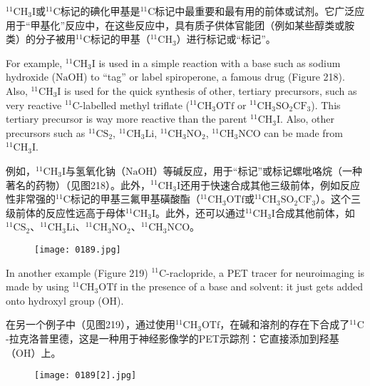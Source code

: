 \documentclass[dvipsnames, svgnames,a4paper,11pt]{article}
\begin{document}
$\mathrm{{}^{11}CH_3I}$或$\mathrm{{}^{11}C}$标记的碘化甲基是${}^\mathrm{11}\mathrm{C}$标记中最重要和最有用的前体或试剂。它广泛应用于“甲基化”反应中，在这些反应中，具有质子供体官能团（例如某些醇类或胺类）的分子被用$\mathrm{{}^{11}C}$标记的甲基（$\mathrm{{}^{11}CH_3}$）进行标记或“标记”。

For example, $\mathrm{{}^{11}CH_3I}$ is used in a simple reaction with a base such as sodium hydroxide ($\mathrm{NaOH}$) to “tag” or label spiroperone, a famous drug (Figure 218). Also, $\mathrm{{}^{11}CH_3I}$ is used for the quick synthesis of other, tertiary precursors, such as very reactive $\mathrm{{}^{11}C}$-labelled methyl triflate ($\mathrm{{}^{11}CH_3OTf}$ or $\mathrm{{}^{11}CH_3SO_2CF_3}$). This tertiary precursor is way more reactive than the parent $\mathrm{{}^{11}CH_3I}$. Also, other precursors such as $\mathrm{{}^{11}CS_2}$, $\mathrm{{}^{11}CH_3Li}$, $\mathrm{{}^{11}CH_3NO_2}$, $\mathrm{{}^{11}CH_3NCO}$ can be made from $\mathrm{{}^{11}CH_3I}$.

例如，$\mathrm{{}^{11}CH_3I}$与氢氧化钠（$\mathrm{NaOH}$）等碱反应，用于“标记”或标记螺吡咯烷（一种著名的药物）（见图218）。此外，$\mathrm{{}^{11}CH_3I}$还用于快速合成其他三级前体，例如反应性非常强的$\mathrm{{}^{11}C}$标记的甲基三氟甲基磺酸酯（$\mathrm{{}^{11}CH_3OTf}$或$\mathrm{{}^{11}CH_3SO_2CF_3}$）。这个三级前体的反应性远高于母体$\mathrm{{}^{11}CH_3I}$。此外，还可以通过$\mathrm{{}^{11}CH_3I}$合成其他前体，如$\mathrm{{}^{11}CS_2}$、$\mathrm{{}^{11}CH_3Li}$、$\mathrm{{}^{11}CH_3NO_2}$、$\mathrm{{}^{11}CH_3NCO}$。


\begin{figure}[h]
	\centering
    \texttt{[image: 0189.jpg]}  
     \label{fig218}
\end{figure}

In another example (Figure 219) $\mathrm{{}^{11}C}$-raclopride, a PET tracer for neuroimaging is made by using $\mathrm{{}^{11}CH_3OTf}$ in the presence of a base and solvent: it just gets added onto hydroxyl group (OH).

在另一个例子中（见图219），通过使用$\mathrm{{}^{11}CH_3OTf}$，在碱和溶剂的存在下合成了$\mathrm{{}^{11}C}$-拉克洛普里德，这是一种用于神经影像学的PET示踪剂：它直接添加到羟基（OH）上。

\begin{figure}[h]
	\centering
    \texttt{[image: 0189[2].jpg]}  
     \label{fig219}
\end{figure}
\end{document}
